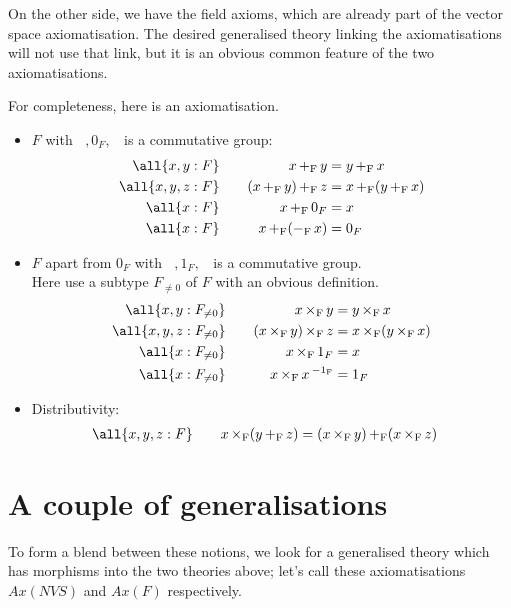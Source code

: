 \documentclass{my-blue-book}
\DeclareMathOperator{\plusF}{+_F}
\DeclareMathOperator{\minusF}{-_F}
\DeclareMathOperator{\timesF}{\times_{F}}
\DeclareMathOperator{\invF}{^{-1_F}}
\newcommand{\oneF}{1_F}
\newcommand{\zeroF}{0_F}
\newcommand{\FnotZero}{F_{\neq 0}}
\begin{document}
On the other side, we have the field axioms, which are already part
of the vector space axiomatisation.  The desired generalised theory
linking the axiomatisations will not use that link, but it
is an obvious common feature of the two axiomatisations.

For completeness, here is an axiomatisation.

\begin{itemize}
\item $F$ with $\plusF, \zeroF, \minusF$ is a commutative group:
  \begin{alignat}{2}
  \all{x,y:F} \quad&&x \plusF y         &= y \plusF x\\
  \all{x,y,z:F} \quad &&(x \plusF y) \plusF z &= x \plusF (y \plusF x)\\
  \all{x:F}  \quad&&x \plusF \zeroF    &= x\\
  \all{x:F}  \quad&&x \plusF (\minusF{x}) &= \zeroF
\end{alignat}
\item 
  $F$ apart from $\zeroF$ with $\timesF, \oneF, \invF$ is a commutative group.\\
  Here use a subtype $\FnotZero$ of $F$ with an obvious definition.
  \begin{alignat}{2}
  \all{x,y:\FnotZero} \quad&&x \timesF y         &= y \timesF x\\
  \all{x,y,z:\FnotZero} \quad &&(x \timesF y) \timesF z &= x \timesF (y \timesF x)\\
  \all{x:\FnotZero}  \quad&&x \timesF \oneF    &= x\\
  \all{x:\FnotZero}  \quad&&x \timesF x\invF   &= \oneF
\end{alignat}

\item 
 Distributivity:
  \begin{alignat}{2}
  \all{x,y,z:F} \quad&&x \timesF (y \plusF z)  &= 
           (x \timesF y) \plusF (x \timesF z)
\end{alignat}  

\end{itemize}

\section{A couple of generalisations}
\label{sec:couple-gener}

To form a blend between these notions, we look for
a generalised theory which has morphisms into the two theories
above;  let's call these axiomatisations $Ax(NVS)$ and $Ax(F)$
respectively.
\end{document}
